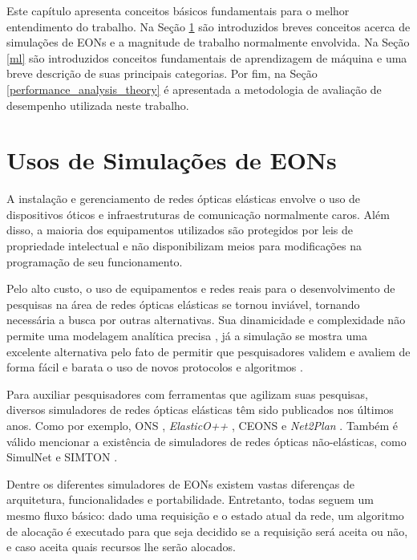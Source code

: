 Este capítulo apresenta conceitos básicos fundamentais para o melhor entendimento do trabalho. Na Seção \ref{ft_eon} são introduzidos breves conceitos acerca de simulações de EONs e a magnitude de trabalho normalmente envolvida. Na Seção \ref{ml} são introduzidos conceitos fundamentais de aprendizagem de máquina e uma breve descrição de suas principais categorias. Por fim, na Seção \ref{performance_analysis_theory} é apresentada a metodologia de avaliação de desempenho utilizada neste trabalho.

\section{Usos de Simulações de EONs}%
\label{ft_eon}

A instalação e gerenciamento de redes ópticas elásticas envolve o uso de dispositivos óticos e infraestruturas de comunicação normalmente caros. Além disso, a maioria dos equipamentos utilizados são protegidos por leis de propriedade intelectual e não disponibilizam meios para modificações na programação de seu funcionamento.

Pelo alto custo, o uso de equipamentos e redes reais para o desenvolvimento de pesquisas na área de redes ópticas elásticas se tornou inviável, tornando necessária a busca por outras alternativas. Sua dinamicidade e complexidade não permite uma modelagem analítica precisa \cite{costa2016ons}, já a simulação se mostra uma excelente alternativa pelo fato de permitir que pesquisadores validem e avaliem de forma fácil e barata o uso de novos protocolos e algoritmos \cite{simulnet2009}.

Para auxiliar pesquisadores com ferramentas que agilizam suas pesquisas, diversos simuladores de redes ópticas elásticas têm sido publicados nos últimos anos. Como por exemplo, \acrfull{ONS} \cite{costa2016ons}, \textit{ElasticO++} \cite{TESSINARI201695}, \acrfull{CEONS} \cite{ceons2015} e \textit{Net2Plan} \cite{net2plan}. Também é válido mencionar a existência de simuladores de redes ópticas não-elásticas, como SimulNet \cite{simulnet2009} e SIMTON \cite{chaves2010}.

Dentre os diferentes simuladores de EONs existem vastas diferenças de arquitetura, funcionalidades e portabilidade. Entretanto, todas seguem um mesmo fluxo básico: dado uma requisição e o estado atual da rede, um algoritmo de alocação é executado para que seja decidido se a requisição será aceita ou não, e caso aceita quais recursos lhe serão alocados.

